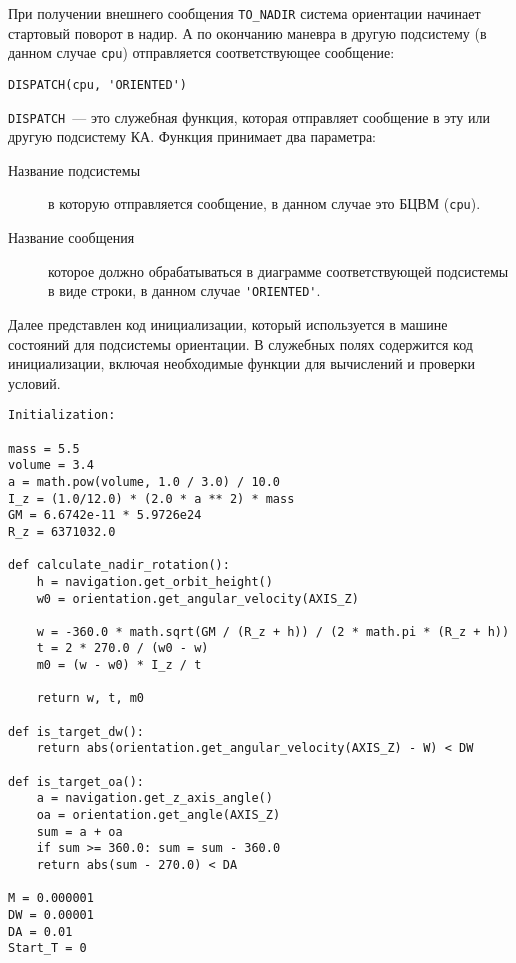 \documentclass[12pt,a4paper]{article}
\begin{document}
При получении внешнего сообщения \verb'TO_NADIR' система ориентации начинает стартовый
поворот в надир. А по окончанию маневра в другую подсистему (в данном случае \verb'cpu')
отправляется соответствующее сообщение:

\begin{center}
\begin{verbatim}
DISPATCH(cpu, 'ORIENTED')
\end{verbatim}
\end{center}

\verb'DISPATCH'~--- это служебная функция, которая отправляет сообщение в эту или другую
подсистему КА. Функция принимает два параметра:

\begin{description}
\item[Название подсистемы] в которую отправляется сообщение, в данном случае это БЦВМ
  (\verb'cpu').
\item[Название сообщения] которое должно обрабатываться в диаграмме соответствующей
  подсистемы в виде строки, в данном случае \verb"'ORIENTED'".
\end{description}

Далее представлен код инициализации, который используется в машине состояний для
подсистемы ориентации. В служебных полях содержится код инициализации, включая необходимые
функции для вычислений и проверки условий.

\begin{verbatim}
Initialization:

mass = 5.5
volume = 3.4
a = math.pow(volume, 1.0 / 3.0) / 10.0
I_z = (1.0/12.0) * (2.0 * a ** 2) * mass
GM = 6.6742e-11 * 5.9726e24 
R_z = 6371032.0

def calculate_nadir_rotation():
    h = navigation.get_orbit_height()
    w0 = orientation.get_angular_velocity(AXIS_Z)

    w = -360.0 * math.sqrt(GM / (R_z + h)) / (2 * math.pi * (R_z + h))
    t = 2 * 270.0 / (w0 - w)
    m0 = (w - w0) * I_z / t

    return w, t, m0

def is_target_dw():
    return abs(orientation.get_angular_velocity(AXIS_Z) - W) < DW

def is_target_oa():
    a = navigation.get_z_axis_angle()
    oa = orientation.get_angle(AXIS_Z)
    sum = a + oa
    if sum >= 360.0: sum = sum - 360.0
    return abs(sum - 270.0) < DA

M = 0.000001
DW = 0.00001
DA = 0.01
Start_T = 0
\end{verbatim}
\end{document}

